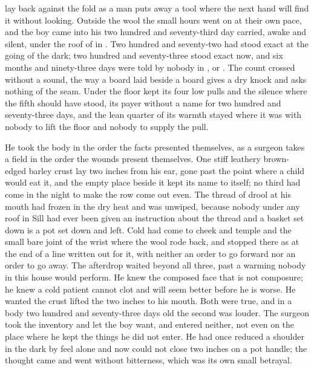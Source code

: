 
 lay back against the fold as a man puts away a tool where the next hand will find it without looking. Outside the wool the small hours went on at their own pace, and the boy came into his two hundred and seventy-third day carried, awake and silent, under the roof of  in . Two hundred and seventy-two had stood exact at the going of the dark; two hundred and seventy-three stood exact now, and six months and ninety-three days were told by nobody in ,  or . The count crossed without a sound, the way a board laid beside a board gives a dry knock and asks nothing of the seam. Under the floor  kept its four low pulls and the silence where the fifth should have stood, its payer without a name for two hundred and seventy-three days, and the lean quarter of its warmth stayed where it was with nobody to lift the floor and nobody to supply the pull.

He took the body in the order the facts presented themselves, as a surgeon takes a field in the order the wounds present themselves. One stiff leathery brown-edged barley crust lay two inches from his ear, gone past the point where a child would eat it, and the empty place beside it kept its name to itself; no third had come in the night to make the row come out even. The thread of drool at his mouth had frozen in the dry heat and was unwiped, because nobody under any roof in Sill had ever been given an instruction about the thread and a basket set down is a pot set down and left. Cold had come to cheek and temple and the small bare joint of the wrist where the wool rode back, and stopped there as at the end of a line written out for it, with neither an order to go forward nor an order to go away. The afterdrop waited beyond all three, past a warming nobody in this house would perform. He knew the composed face that is not composure; he knew a cold patient cannot clot and will seem better before he is worse. He wanted the crust lifted the two inches to his mouth. Both were true, and in a body two hundred and seventy-three days old the second was louder. The surgeon took the inventory and let the boy want, and entered neither, not even on the place where he kept the things he did not enter. He had once reduced a shoulder in the dark by feel alone and now could not close two inches on a pot handle; the thought came and went without bitterness, which was its own small betrayal.


